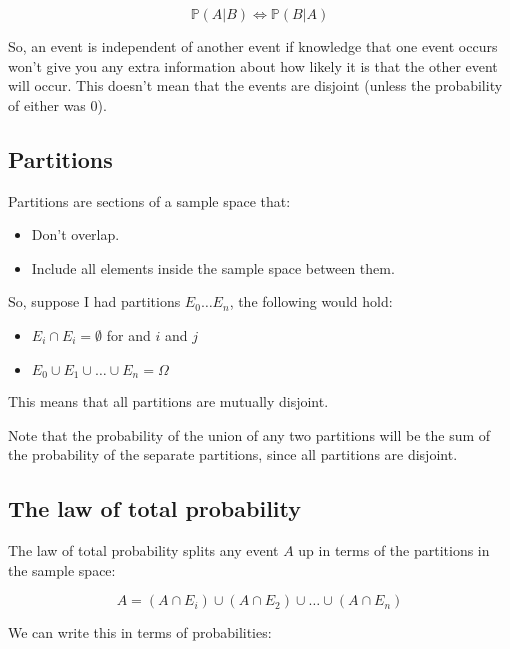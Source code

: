 \begin{dmath*}
	{\mathbb{P}(A|B) \iff \mathbb{P}(B|A)}
\end{dmath*}

So, an event is independent of another event if knowledge that one event occurs
won't give you any extra information about how likely it is that the other event
will occur. This doesn't mean that the events are disjoint (unless the
probability of either was $0$).

\subsection{Partitions}

Partitions are sections of a sample space that:

\begin{itemize}
	\item Don't overlap.
	\item Include all elements inside the sample space between them.
\end{itemize}

So, suppose I had partitions $E_0 \dots E_n$, the following would hold:

\begin{itemize}
	\item $E_i \cap E_i = \emptyset$ for and $i$ and $j$
	\item $E_0 \cup E_1 \cup \dots \cup E_n = \Omega$
\end{itemize}

This means that all partitions are mutually disjoint.


Note that the probability of the union of any two partitions will be the sum of
the probability of the separate partitions, since all partitions are disjoint.

\subsection{The law of total probability}

The law of total probability splits any event $A$ up in terms of the partitions
in the sample space:

\begin{dmath*}
	A = (A \cap E_i) \cup (A \cap E_2) \cup \dots \cup (A \cap E_n)
\end{dmath*}

We can write this in terms of probabilities:

